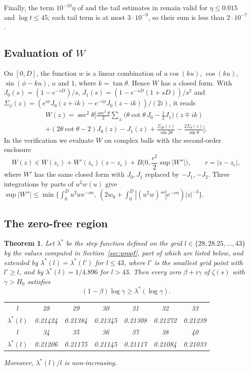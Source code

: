 \documentclass[11pt]{amsart}
\numberwithin{equation}{section}
\newtheorem{theorem}{Theorem}[section]
\theoremstyle{definition}
\theoremstyle{remark}
\begin{document}
Finally, the term $10^{-10}\eta$ of \cite[Lemma~13]{BTY} and the tail estimates in \cite[Lemma~6]{BTY} remain valid for $\eta \leq 0.015$ and $\log t \leq 45$; each tail term is at most $3\cdot10^{-9}$, so their sum is less than $2\cdot10^{-7}$.

\subsection{Evaluation of \texorpdfstring{$W$}{W}}

On $[0, D]$, the function $w$ is a linear combination of $u\cos(ku)$, $\cos(ku)$, $\sin(\phi - ku)$, $u$ and $1$, where $k = \tan\theta$.
Hence $W$ has a closed form.
With $J_0(s) = (1 - e^{-sD})/s$, $J_1(s) = (1 - e^{-sD}(1 + sD))/s^2$ and $\Sigma_\phi(z) = (e^{i\phi}J_0(z + ik) - e^{-i\phi}J_0(z - ik))/(2i)$, it reads
\begin{multline*}
W(z) = \sec^2\theta\Big[\frac{\sec^2\theta}{2}\sum_\pm\Big(\theta\cot\theta\,J_0 - \frac12J_1\Big)(z \mp ik)\\
+ (2\theta\cot\theta - 2)J_0(z) - J_1(z) + \frac{\Sigma_{2\theta}(z)}{\sin2\theta} - \frac{2\Sigma_\theta(z)}{\sin\theta}\Big].
\end{multline*}
In the verification we evaluate $W$ on complex balls with the second-order enclosure
\[
W(z) \in W(z_c) + W'(z_c)(z - z_c) + B\Big(0, \frac{r^2}2\sup|W''|\Big), \qquad r = |z - z_c|,
\]
where $W'$ has the same closed form with $J_0, J_1$ replaced by $-J_1, -J_2$.
Three integrations by parts of $u^2w(u)$ give $\sup|W''| \leq \min\{\int_0^Du^2we^{-\nu u},\ (2w_0 + \int_0^D|(u^2w)'''|e^{-\nu u})|z|^{-3}\}$.

\subsection{The zero-free region}

\begin{theorem}\label{thm:H}
Let $\lambda^*$ be the step function defined on the grid $l \in \{28, 28.25, \ldots, 43\}$ by the values computed in Section~\ref{sec:proof}, part of which are listed below, and extended by $\lambda^*(l) = \lambda^*(l')$ for $l \leq 43$, where $l'$ is the smallest grid point with $l' \geq l$, and by $\lambda^*(l) = 1/4.896$ for $l > 43$.
Then every zero $\beta + i\gamma$ of $\zeta(s)$ with $\gamma > H_0$ satisfies
\[
(1 - \beta)\log\gamma \geq \lambda^*(\log\gamma).
\]
\begin{center}\small
\begin{tabular}{c|cccccc}
\toprule
$l$ & 28 & 29 & 30 & 31 & 32 & 33\\
$\lambda^*(l)$ & 0.21424 & 0.21384 & 0.21345 & 0.21308 & 0.21272 & 0.21239\\
\midrule
$l$ & 34 & 35 & 36 & 37 & 38 & 40\\
$\lambda^*(l)$ & 0.21206 & 0.21175 & 0.21145 & 0.21117 & 0.21084 & 0.21033\\
\bottomrule
\end{tabular}
\end{center}
Moreover, $\lambda^*(l)/l$ is non-increasing.
\end{theorem}
\end{document}
